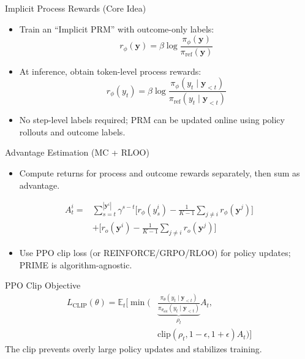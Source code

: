 \documentclass{beamer}
\begin{document}
\begin{frame}{Implicit Process Rewards (Core Idea)}
  \begin{itemize}
    \item Train an ``Implicit PRM'' with outcome-only labels:
    \[ r_\phi(\mathbf{y}) = \beta \log \frac{\pi_\phi(\mathbf{y})}{\pi_{\text{ref}}(\mathbf{y})} \]
    \item At inference, obtain token-level process rewards:
    \[ r_\phi(y_t) = \beta \log \frac{\pi_\phi(y_t\mid \mathbf{y}_{<t})}{\pi_{\text{ref}}(y_t\mid \mathbf{y}_{<t})} \]
    \item No step-level labels required; PRM can be updated online using policy rollouts and outcome labels.
  \end{itemize}
\end{frame}

\begin{frame}{Advantage Estimation (MC + RLOO)}
  \begin{itemize}
    \item Compute returns for process and outcome rewards separately, then sum as advantage.
  \end{itemize}
  \small
  \begin{align*}
  A^i_t =& \sum_{s=t}^{|\mathbf{y}^i|} \gamma^{s-t} \Big[r_\phi(y^i_s) - \tfrac{1}{K-1}\sum_{j\neq i} r_\phi(\mathbf{y}^j)\Big]\\
  &+ \Big[r_o(\mathbf{y}^i) - \tfrac{1}{K-1}\sum_{j\neq i} r_o(\mathbf{y}^j)\Big]
  \end{align*}
  \normalsize
  \vspace{2mm}
  \begin{itemize}
    \item Use PPO clip loss (or REINFORCE/GRPO/RLOO) for policy updates; PRIME is algorithm-agnostic.
  \end{itemize}
\end{frame}

\begin{frame}{PPO Clip Objective}
  \small
  \begin{align*}
    L_{\text{CLIP}}(\theta) = \mathbb{E}_t\Big[ \min\big(&\underbrace{\tfrac{\pi_\theta(y_t\mid \mathbf{y}_{<t})}{\pi_{\theta_{\text{old}}}(y_t\mid \mathbf{y}_{<t})}}_{\rho_t} A_t,\\
    &\text{clip}(\rho_t, 1-\epsilon, 1+\epsilon) A_t \big) \Big]
  \end{align*}
  \normalsize
  \vspace{1mm}
  {\footnotesize The clip prevents overly large policy updates and stabilizes training.}
\end{frame}
\end{document}
